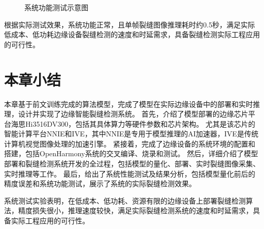 \begin{figure}[H]
    \caption{系统功能测试示意图}
    \label{func-test}
\end{figure}  

根据实际测试效果，系统功能正常，且单帧裂缝图像推理耗时约0.5秒，满足实际低成本、低功耗边缘设备裂缝检测的速度和时延需求，具备裂缝检测实际工程应用的可行性。

\section{本章小结}
本章基于前文训练完成的算法模型，完成了模型在实际边缘设备中的部署和实时推理，设计并实现了边缘智能裂缝检测系统。
首先，介绍了模型部署的边缘芯片平台海思Hi3516DV300，包括其具体算力等硬件参数和芯片架构。
尤其是该芯片的智能计算平台NNIE和IVE，其中NNIE是专用于模型推理的AI加速器，IVE是传统计算机视觉图像处理的加速引擎。
紧接着，完成了边缘设备的系统环境的配置和搭建，包括OpenHarmony系统的交叉编译、烧录和测试。
然后，详细介绍了模型部署和裂缝检测系统开发的全过程，包括模型的量化、部署、实时裂缝图像采集、实时推理等工作。
最后，给出了系统性能测试及结果分析，包括模型量化前后的精度误差和系统功能测试，展示了系统的实际裂缝检测效果。

系统测试实验表明，在低成本、低功耗、资源有限的边缘设备上部署裂缝检测算法，精度损失很小，推理速度较快，满足实际裂缝检测系统的速度和时延需求，具备实际工程应用的可行性。